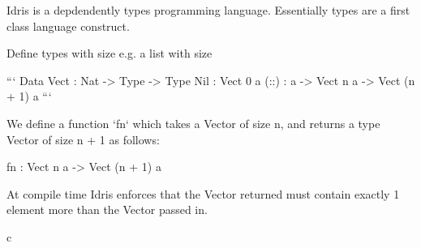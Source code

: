 Idris is a depdendently types programming language.
Essentially types are a first class language construct.

Define types with size e.g. a list with size

```
Data Vect : Nat -> Type -> Type
Nil : Vect 0 a
(::) : a -> Vect n a -> Vect (n + 1) a
```

We define a function `fn` which takes a Vector of size
n, and returns a type Vector of size n + 1 as follows:

fn : Vect n a -> Vect (n + 1) a

At compile time Idris enforces that the Vector returned must
contain exactly 1 element more than the Vector passed in.

c
